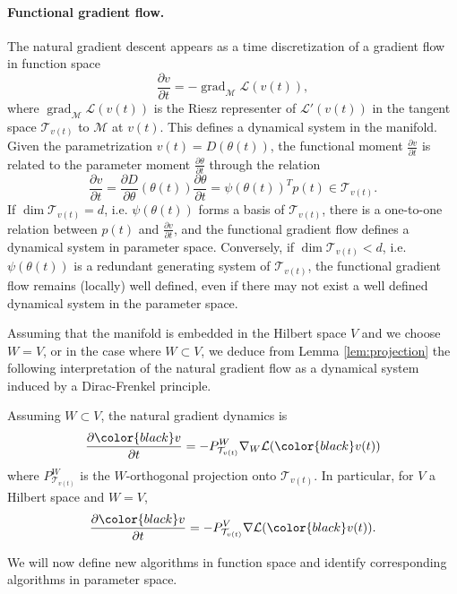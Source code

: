 \documentclass{article}
\theoremstyle{noparens}
\newcommand{\cL}{\mathcal{L}}
\newcommand{\cT}{\mathcal{T}}
\newcommand{\cM}{\mathcal{M}}
\newcommand{\colorM}{\color{black}}
\renewcommand{\v}{{\colorM v}}
\newcommand{\dvdt}{\frac{\partial \v}{\partial t}}
\newcommand{\gradM}{\operatorname{grad}_{\cM}}
\begin{document}
\paragraph{Functional gradient flow.}
The natural gradient descent appears as a time discretization of a gradient flow in function space
\begin{equation}
\frac{\partial v}{\partial t} = - \gradM \cL(v(t)) , \label{eq:natural-gradient-flow}
\end{equation}
where $\gradM \cL(v(t))$ is the Riesz representer of $\cL'(v(t))$ in the tangent space $\cT_{v(t)} $ to $\cM$ at $v(t).$  This defines a dynamical system in the manifold.
Given the parametrization $v(t) = D(\theta(t))$, the functional moment $\frac{\partial v}{\partial t}$ is related to the parameter moment $\frac{\partial \theta}{\partial t}$ through the relation
$$
\frac{\partial v}{\partial t} = \frac{\partial D}{\partial \theta}(\theta(t)) \frac{\partial \theta}{\partial t} = \psi(\theta(t))^T p(t) \in \cT_{v(t)}.$$
If $\dim \cT_{v(t)} = d$, i.e.  $\psi(\theta(t))$ forms a basis of $\cT_{v(t)}$, there is a one-to-one relation between  $p(t)$ and  $\frac{\partial v}{\partial t}$, and the functional gradient flow defines a dynamical system in parameter space.
Conversely, if $\dim \cT_{v(t)} < d$, i.e. $\psi(\theta(t))$ is a redundant generating system of $\cT_{v(t)}$, the functional gradient flow remains (locally) well defined, even if there   may not exist a well defined dynamical system in the parameter space.

Assuming that the manifold is embedded in the  Hilbert space $V$ and we choose $W=V$, or in the case where $W \subset V$, we deduce from Lemma \ref{lem:projection}  the
following interpretation of the natural gradient flow as a dynamical system induced by a Dirac-Frenkel principle.
\begin{proposition}
\label{prop:projection}
Assuming $W\subset V$,  the natural gradient dynamics is
$$\dvdt = -P^W_{\cT_{v(t)}} \nabla_W \cL(\v(t))$$
where $P^W_{\cT_{v(t)}}$ is the $W$-orthogonal projection onto $\cT_{v(t)}$. In particular, for $V$ a Hilbert space and $W=V$,
$$\dvdt = -P^V_{\cT_{v(t)}} \nabla \cL(\v(t)).$$
\end{proposition}

We will now define new algorithms in function space and identify corresponding algorithms in parameter space.
\end{document}
